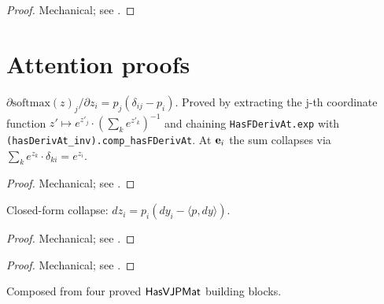 \begin{proof}
\leanok
Mechanical; see .
\end{proof}

\section{Attention proofs}
\label{sec:attention_proofs}

\begin{theorem}
  \label{ax:pdiv_softmax}
  \leanok
  \(\partial \mathrm{softmax}(z)_j / \partial z_i = p_j (\delta_{ij} - p_i)\).
  Proved by extracting the j-th coordinate function
  \(z' \mapsto e^{z'_j} \cdot (\sum_k e^{z'_k})^{-1}\) and chaining
  \texttt{HasFDerivAt.exp} with \texttt{(hasDerivAt\_inv).comp\_hasFDerivAt}.
  At \(\mathbf{e}_i\) the sum collapses via \(\sum_k e^{z_k} \cdot \delta_{ki} = e^{z_i}\).
\end{theorem}

\begin{proof}
\leanok
Mechanical; see .
\end{proof}

\begin{theorem}
  \label{thm:softmax_has_vjp}
  \leanok
  Closed-form collapse: \(dz_i = p_i (dy_i - \langle p, dy \rangle)\).
\end{theorem}

\begin{proof}
\leanok
Mechanical; see .
\end{proof}

\begin{theorem}
  \label{thm:rowSoftmax_has_vjp_mat}
  \leanok
\end{theorem}

\begin{proof}
\leanok
Mechanical; see .
\end{proof}

\begin{theorem}
  \label{thm:sdpa_back_Q_correct}
  \leanok
  Composed from four proved \(\mathsf{HasVJPMat}\) building blocks.
\end{theorem}

